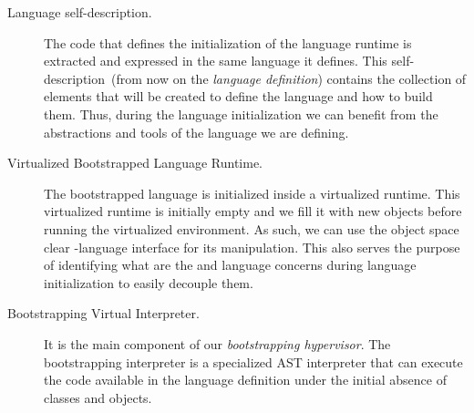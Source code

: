 \begin{description}
\item[Language self-description.] The code that defines the initialization of the language runtime is extracted and expressed in the same language it defines. This self-description~(from now on the \emph{language definition}) contains the collection of elements that will be created to define the language and how to build them. Thus, during the language initialization we can benefit from the abstractions and tools of the language we are defining.

\item[Virtualized Bootstrapped Language Runtime.] The bootstrapped language is initialized inside a virtualized runtime. This virtualized runtime is initially empty and we fill it with new objects before running the virtualized environment. As such, we can use the object space clear \VM-language interface for its manipulation. This also serves the purpose of identifying what are the \VM and language concerns during language initialization to easily decouple them.

\item[Bootstrapping Virtual Interpreter.] It is the main component of our \emph{bootstrapping hypervisor}. The bootstrapping interpreter is a specialized AST interpreter that can execute the code available in the language definition under the initial absence of classes and objects.
\end{description}





